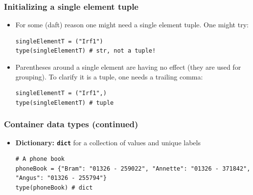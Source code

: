 \documentclass[xcolor=table]{beamer}
\begin{document}
\begin{frame}[fragile]
    \frametitle{Initializing a single element tuple}
    \begin{itemize}
        \item For some (daft) reason one might need a single element tuple. One might try:
\begin{lstlisting}[style=python]
singleElementT = ("Irf1")
type(singleElementT) # str, not a tuple!
\end{lstlisting}
        \pause
        \item Parentheses around a single element are having no effect (they are used for grouping). To clarify it is a tuple, one needs a trailing comma:
\begin{lstlisting}[style=python]
singleElementT = ("Irf1",)
type(singleElementT) # tuple
\end{lstlisting}
    \end{itemize}
\end{frame}

\begin{frame}[fragile]
    \frametitle{Container data types (continued)}
\begin{itemize}\addtolength{\itemsep}{-0.5\baselineskip}
\item \textbf{Dictionary: \texttt{dict}} for a collection of values and unique labels 
\begin{lstlisting}[style=python]
# A phone book
phoneBook = {"Bram": "01326 - 259022", "Annette": "01326 - 371842", "Angus": "01326 - 255794"}
type(phoneBook) # dict
\end{lstlisting}

\end{itemize}
\end{frame}
\end{document}
